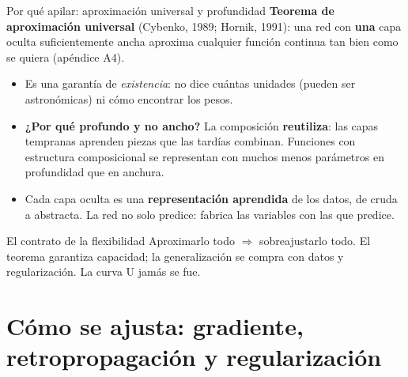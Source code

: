\documentclass{beamer}
\newcommand{\1}{\mathbb{I}}
\begin{document}
\begin{frame}{Por qué apilar: aproximación universal y profundidad}
\small
\textbf{Teorema de aproximación universal} (Cybenko, 1989; Hornik, 1991): una red con \textbf{una} capa oculta suficientemente ancha aproxima cualquier función continua tan bien como se quiera (apéndice A4).
\pause
\begin{itemize}\itemsep3pt
  \item Es una garantía de \emph{existencia}: no dice cuántas unidades (pueden ser astronómicas) ni cómo encontrar los pesos. \pause
  \item \textbf{¿Por qué profundo y no ancho?} La composición \textbf{reutiliza}: las capas tempranas aprenden piezas que las tardías combinan. Funciones con estructura composicional se representan con muchos menos parámetros en profundidad que en anchura. \pause
  \item Cada capa oculta es una \textbf{representación aprendida} de los datos, de cruda a abstracta. La red no solo predice: fabrica las variables con las que predice.
\end{itemize}
\pause
\begin{block}{El contrato de la flexibilidad}
Aproximarlo todo $\Rightarrow$ sobreajustarlo todo. El teorema garantiza capacidad; la generalización se compra con datos y regularización. La curva U jamás se fue.
\end{block}
\end{frame}


\section{Cómo se ajusta: gradiente, retropropagación y regularización}
\begin{frame}[noframenumbering]
\tableofcontents[currentsection]
\end{frame}
\end{document}

